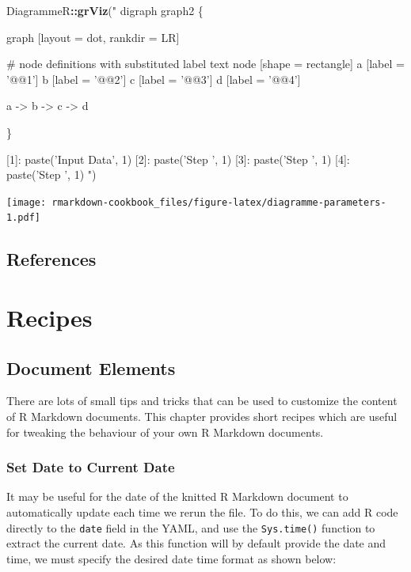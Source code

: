\documentclass[]{book}
\newenvironment{Shaded}{\begin{snugshade}}{\end{snugshade}}
\newcommand{\KeywordTok}[1]{\textcolor[rgb]{0.13,0.29,0.53}{\textbf{#1}}}
\newcommand{\StringTok}[1]{\textcolor[rgb]{0.31,0.60,0.02}{#1}}
\newcommand{\OperatorTok}[1]{\textcolor[rgb]{0.81,0.36,0.00}{\textbf{#1}}}
\newcommand{\NormalTok}[1]{#1}
\begin{document}
\begin{Shaded}
\begin{Highlighting}[]
\NormalTok{DiagrammeR}\OperatorTok{::}\KeywordTok{grViz}\NormalTok{(}\StringTok{"}
\StringTok{digraph graph2 \{}

\StringTok{graph [layout = dot, rankdir = LR]}

\StringTok{# node definitions with substituted label text}
\StringTok{node [shape = rectangle]}
\StringTok{a [label = '@@1']}
\StringTok{b [label = '@@2']}
\StringTok{c [label = '@@3']}
\StringTok{d [label = '@@4']}

\StringTok{a -> b -> c -> d}

\StringTok{\}}

\StringTok{[1]: paste('Input Data', 1)}
\StringTok{[2]: paste('Step ', 1)}
\StringTok{[3]: paste('Step ', 1)}
\StringTok{[4]: paste('Step ', 1)}
\StringTok{"}\NormalTok{)}
\end{Highlighting}
\end{Shaded}

\texttt{[image: rmarkdown-cookbook\_files/figure-latex/diagramme-parameters-1.pdf]}

\chapter{References}\label{references}

\part{Recipes}\label{part-recipes}

\chapter{Document Elements}\label{document-elements}

There are lots of small tips and tricks that can be used to customize
the content of R Markdown documents. This chapter provides short recipes
which are useful for tweaking the behaviour of your own R Markdown
documents.

\section{Set Date to Current Date}\label{set-date-to-current-date}

It may be useful for the date of the knitted R Markdown document to
automatically update each time we rerun the file. To do this, we can add
R code directly to the \texttt{date} field in the YAML, and use the
\texttt{Sys.time()} function to extract the current date. As this
function will by default provide the date and time, we must specify the
desired date time format as shown below:
\end{document}
